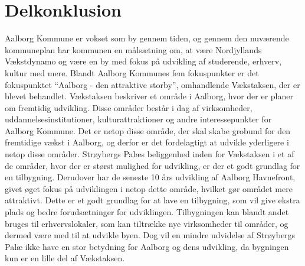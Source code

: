 \section{Delkonklusion}
Aalborg Kommune er vokset som by gennem tiden, og gennem den nuværende kommuneplan har kommunen en målsætning om, at være Nordjyllands Vækstdynamo og være en by med fokus på udvikling af studerende, erhverv, kultur med mere. 
\newline \indent{     }  Blandt Aalborg Kommunes fem fokuspunkter er det fokuspunktet “Aalborg - den attraktive storby”, omhandlende Vækstaksen, der er blevet behandlet. Vækstaksen beskriver et område i Aalborg, hvor der er planer om fremtidig udvikling. Disse områder består i dag af virksomheder, uddannelsesinstitutioner, kulturattraktioner og andre interessepunkter for Aalborg Kommune. Det er netop disse område, der skal skabe grobund for den fremtidige vækst i Aalborg, og derfor er det fordelagtigt at udvikle yderligere i netop disse områder.
\newline \indent{     }  Strøybergs Palæs beliggenhed inden for Vækstaksen i et af de områder, hvor der er størst mulighed for udvikling, er der et godt grundlag for en tilbygning. Derudover har de seneste 10 års udvikling af Aalborg Havnefront, givet øget fokus på udviklingen i netop dette område, hvilket  gør området mere attraktivt. Dette er et godt grundlag for at lave en tilbygning, som vil give ekstra plads og bedre forudsætninger for udviklingen. Tilbygningen kan blandt andet bruges til erhvervslokaler, som kan tiltrække nye virksomheder til områder, og dermed være med til at udvikle byen.  Dog vil en mindre udvidelse af Strøybergs Palæ ikke have en stor betydning for Aalborg og dens udvikling, da bygningen kun er en lille del af Vækstaksen.
